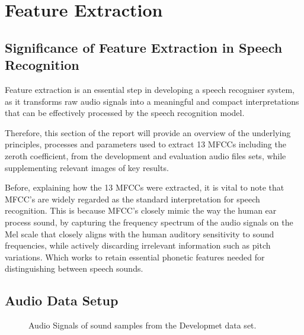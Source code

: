 \documentclass{article}
\begin{document}

\section{Feature Extraction}

\subsection{Significance of Feature Extraction in Speech Recognition}
Feature extraction is an essential step in developing a speech recogniser system, as it transforms raw audio signals into a meaningful and compact interpretations that can be effectively processed by the speech recognition model.

Therefore, this section of the report will provide an overview of the underlying principles, processes and parameters used to extract 13 MFCCs including the zeroth coefficient, from the development and evaluation audio files sets, while supplementing relevant images of key results.

Before, explaining how the 13 MFCCs were extracted, it is vital to note that MFCC’s are widely regarded as the standard interpretation for speech recognition. This is because MFCC’s closely mimic the way the human ear process sound, by capturing the frequency spectrum of the audio signals on the Mel scale that closely aligns with the human auditory sensitivity to sound frequencies, while actively discarding irrelevant information such as pitch variations. Which works to retain essential phonetic features needed for distinguishing between speech sounds. 

\subsection{Audio Data Setup}


\begin{figure}[!h]
  \centering
  \hfill
  \hfill
  \hfill
  \caption{\label{fig:audio} Audio Signals of sound samples from the Developmet data set.}
\end{figure}
\end{document}
